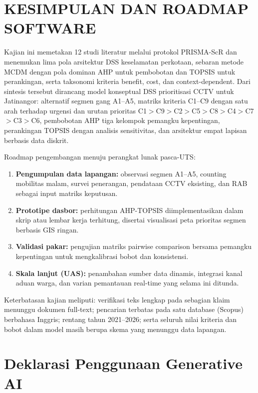 \documentclass[conference]{IEEEtran}
\begin{document}
\section{KESIMPULAN DAN ROADMAP SOFTWARE}

Kajian ini memetakan 12 studi literatur melalui protokol PRISMA-ScR dan menemukan lima pola arsitektur DSS keselamatan perkotaan, sebaran metode MCDM dengan pola dominan AHP untuk pembobotan dan TOPSIS untuk perankingan, serta taksonomi kriteria benefit, cost, dan context-dependent. Dari sintesis tersebut dirancang model konseptual DSS prioritisasi CCTV untuk Jatinangor: alternatif segmen gang A1--A5, matriks kriteria C1--C9 dengan satu arah terhadap urgensi dan urutan prioritas C1$>$C9$>$C2$>$C5$>$C8$>$C4$>$C7$>$C3$>$C6, pembobotan AHP tiga kelompok pemangku kepentingan, perankingan TOPSIS dengan analisis sensitivitas, dan arsitektur empat lapisan berbasis data diskrit.

Roadmap pengembangan menuju perangkat lunak pasca-UTS:

\begin{enumerate}
\item \textbf{Pengumpulan data lapangan:} observasi segmen A1--A5, counting mobilitas malam, survei penerangan, pendataan CCTV eksisting, dan RAB sebagai input matriks keputusan.
\item \textbf{Prototipe dasbor:} perhitungan AHP-TOPSIS diimplementasikan dalam skrip atau lembar kerja terhitung, disertai visualisasi peta prioritas segmen berbasis GIS ringan.
\item \textbf{Validasi pakar:} pengujian matriks pairwise comparison bersama pemangku kepentingan untuk mengkalibrasi bobot dan konsistensi.
\item \textbf{Skala lanjut (UAS):} penambahan sumber data dinamis, integrasi kanal aduan warga, dan varian pemantauan real-time yang selama ini ditunda.
\end{enumerate}

Keterbatasan kajian meliputi: verifikasi teks lengkap pada sebagian klaim menunggu dokumen full-text; pencarian terbatas pada satu database (Scopus) berbahasa Inggris; rentang tahun 2021--2026; serta seluruh nilai kriteria dan bobot dalam model masih berupa skema yang menunggu data lapangan.

\section*{Deklarasi Penggunaan Generative AI}
\end{document}
